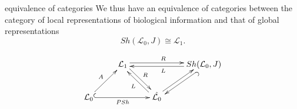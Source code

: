 \begin{frame}
\begin{block}{equivalence of categories}
We thus have an equivalence of categories between the category of local representations of biological information and that of global representations
$$
Sh(\mathcal{L}_0,J) \cong \mathcal{L}_1.
$$
\end{block}
\begin{block}{}
\begin{displaymath}
\xymatrix{
& \mathcal{L}_1 \ar@<0.5ex>[rd]^-{R} \ar@<0.5ex>[rr]^{R} & & Sh(\mathcal{L}_0,J) \ar@<0.5ex>[ll]^{L} \ar@{^{(}->}@<0.5ex>[dl]^{} \\
\mathcal{L}_0 \ar[ru]^{A} \ar@{^{(}->}[rr]_{PSh} & & \hat{\mathcal{L}_0} \ar@<0.5ex>[lu]^-{L} \ar@<0.5ex>[ur]^{}&
}
\end{displaymath}
\end{block}
\end{frame}